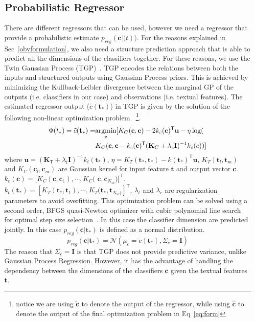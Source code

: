 \subsection{Probabilistic Regressor}
\label{S:Reg}
There are different regressors that can be used, however we need a regressor that provide a probabilistic estimate $p_{reg}(\mathbf{c} | \mathbf(t))$. For the reasons explained in Sec~\ref{obvformulation}, we also need a structure prediction approach that is able to predict all the dimensions of the classifiers together. For these reasons, we use the Twin Gaussian Process (TGP)~\cite{Bo:2010}. 
TGP encodes the relations between both the inputs and structured outputs using Gaussian Process priors. This is achieved by minimizing the Kullback-Leibler divergence between the marginal GP of the outputs (i.e. classifiers in our case) and observations (i.e. textual features). The estimated regressor output ($\tilde{c}(\mathbf{t}_*)$) in TGP is given by the solution of the following non-linear optimization problem~\cite{Bo:2010} \footnote{notice we are using $\mathbf{\tilde{c}}$ to denote the output of the regressor, while using $\mathbf{\hat{c}}$ to denote the output of the final optimization problem in Eq~\ref{eq:form}}.
\begin{equation}                                               
\centering
\begin{split}
{\Phi (t_*)} = \tilde{c}(\mathbf{t}_*) = & \underset{\mathbf{c}}{\operatorname{argmin}}[  K_C(\mathbf{c},\mathbf{c})  -2 k_c(\mathbf{c})^\textsf{T} \mathbf{u} - \eta  \log ( \\ & K_C(\mathbf{c},\mathbf{c} -k_c(\mathbf{c})^\textsf{T} (\mathbf{K}_C+ \lambda_c \mathbf{I})^{-1} k_c(c) ) ]
\end{split}
\label{eq:tgp}
\end{equation}
where $\mathbf{u} = (\mathbf{K}_\textsf{T} + \lambda_t  \mathbf{I})^{-1} k_t(\mathbf{t}_*)$, $\eta  = K_T(\mathbf{t}_*,\mathbf{t}_*) -k(\mathbf{t}_*)^\textsf{T}  \mathbf{u} $,  $K_T(\mathbf{t}_l,\mathbf{t}_m) $ and $K_C(\mathbf{c}_l,\mathbf{c}_m)$ are Gaussian kernel for input feature $\mathbf{t}$ and output vector $\mathbf{c}$.  $k_c(\mathbf{c}) = [K_C(\mathbf{c},\mathbf{c}_1), \cdots, K_C($ $\mathbf{c},\mathbf{c}_{N_{sc}})]^\textsf{T}$. $k_t(\mathbf{t}_*) = [K_T(\mathbf{t}_*,\mathbf{t}_1), \cdots, K_T(\mathbf{t}_*,\mathbf{t}_{N_{sc})}]^\textsf{T}$.  $\lambda_t$ and $\lambda_c$ are regularization parameters to avoid overfitting. This optimization problem can be solved using a second order, BFGS quasi-Newton optimizer with cubic polynomial line search for optimal step size selection~\cite{Bo:2010}. In this case the classifier dimension are predicted jointly. In this case $p_{reg}(\mathbf{c}|\mathbf{t}_*)$ is defined as a normal distribution.
\begin{equation}
\label{eq:ptgp}
p_{reg}(\mathbf{c}|\mathbf{t}_*) =  \mathcal{N} (\mu_c = \tilde{c}(\mathbf{t}_*),\Sigma_c = \mathbf{I})
\end{equation}
The reason that $\Sigma_c = \mathbf{I}$ is that TGP does not provide predictive variance, unlike Gaussian Process Regression. However, it has the advantage of handling the dependency between the dimensions of the classifiers $\mathbf{c}$ given the textual features $\mathbf{t}$. 
 
